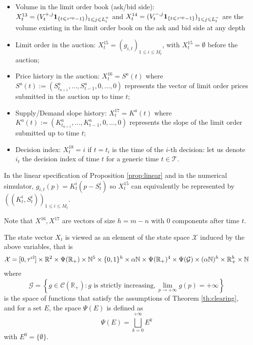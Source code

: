 \documentclass[11pt]{article}
\begin{document}
\begin{itemize}
    \item Volume in the limit order book (ask/bid side): $X_t^{13} = (V_t^{+,j}\mathbf{1}_{\{t \leqslant {\tau^{\mathrm{op}}}-1\}})_{1 \leqslant j \leqslant L_t^+}$ and $X_t^{14} = (V_t^{-,j}\mathbf{1}_{\{t \leqslant {\tau^{\mathrm{op}}}-1\}})_{1 \leqslant j \leqslant L_t^-}$ are the volume existing in the limit order book on the ask and bid side at any depth
    \item Limit order in the auction: $X_t^{15} = (g_{i,t})_{1 \leqslant i \leqslant M_t}$, with $X_t^{15} = \emptyset$ before the auction;
    \item Price history in the auction: $X_t^{16} = S^a(t)$ where $S^a(t):=(S_{t_{n+1}}^a, \ldots, S^a_{t-1},0,\ldots, 0)$ represents the vector of limit order prices submitted in the auction up to time $t$;
    \item Supply/Demand slope history: $X_t^{17} = K^a(t)$ where $K^a(t):=(K_{t_{n+1}}^a,\ldots, K_{t-1}^a,0,\ldots, 0)$ represents the slope of the limit order submitted up to time $t$;
    \item Decision index: $X_t^{18} = i$ if $t = t_i$ is the time of the $i$-th decision: let us denote $i_t$ the decision index of time $t$ for a generic time $t\in \mathcal{T}$.
\end{itemize}

\begin{remark}
\label{rem:linear}
    In the linear specification of Proposition \ref{prop:linear} and in the numerical simulator, $g_{i,t}(p) = K_t^i(p-S_t^i)$ so $X_t^{15}$ can equivalently be represented by $((K_t^i, S_t^i))_{1\leqslant i \leqslant M_t}$.
\end{remark}

\begin{remark}
Note that $X^{16},X^{17}$ are vectors of size $h=m-n$ with $0$ components after time $t$.
\end{remark}

The state vector $X_t$ is viewed as an element of the state space $\mathcal{X}$ induced by the above variables, that is
\[\mathcal{X} = [0,\tau^{\mathrm{cl}}]\times  \mathbb{R}^2\times \Psi(\mathbb{R}_+)\times \mathbb{N}^5 \times \{0,1\}^h \times \alpha\mathbb{N}\times \Psi(\mathbb{R}_+)^4 \times \Psi(\mathcal{G}) \times  (\alpha \mathbb{N})^h\times \mathbb{R}_+^h\times \mathbb{N}\]
where
\[\mathcal{G} = \left\{ g \in \mathcal{C}(\mathbb{R}_+):g \text{ is strictly increasing}, \lim_{p\to+\infty}g(p)=+\infty\right\}\]
is the space of functions that satisfy the assumptions of Theorem \ref{th:clearing}, and for a set $E$, the space $\Psi(E)$ is defined as
\[\Psi(E) = \bigsqcup_{k=0}^{+\infty} E^k\]
with $E^0 = \{\emptyset\}$.
\end{document}
